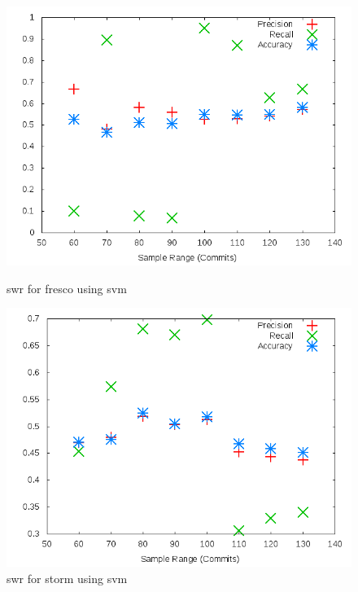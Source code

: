 \begin{figure}[h]
    \centering

    \begin{minipage}[b]{0.45\linewidth}
        \includegraphics[width=1.0\textwidth]{images/svm/test_1/fresco_sample_range}
        \caption{\gls{swr} for fresco using \gls{svm}}
        \label{fig:test_1_fresco_svm}
    \end{minipage}
\quad
    \begin{minipage}[b]{0.45\linewidth}
        \includegraphics[width=1.0\textwidth]{images/svm/test_1/storm_sample_range}
        \caption{\gls{swr} for storm using \gls{svm}}
        \label{fig:test_1_storm_svm}
    \end{minipage}
\end{figure}


